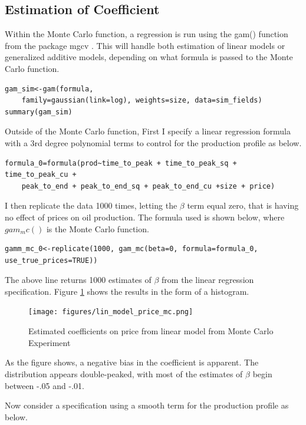 \documentclass[11pt]{article}
\begin{document}
\begin{spacing}{1}
\subsection{Estimation of Coefficient}

Within the Monte Carlo function, a regression is run using the gam() function from the package mgcv \citet{wood_generalized_2006}.  This will handle both estimation of linear models or generalized additive models, depending on what formula is passed to the Monte Carlo function.  

\begin{verbatim}
gam_sim<-gam(formula,
	family=gaussian(link=log), weights=size, data=sim_fields)
summary(gam_sim)
\end{verbatim}

Outside of the Monte Carlo function, First I specify a linear regression formula with a 3rd degree polynomial terms to control for the production profile as below.  

\begin{verbatim}
formula_0=formula(prod~time_to_peak + time_to_peak_sq + time_to_peak_cu + 
	peak_to_end + peak_to_end_sq + peak_to_end_cu +size + price)
\end{verbatim}

I then replicate the data 1000 times, letting the $\beta$ term equal zero, that is having no effect of prices on oil production.  The formula used is shown below, where $gam_mc()$ is the Monte Carlo function.  

\begin{verbatim}
gamm_mc_0<-replicate(1000, gam_mc(beta=0, formula=formula_0, use_true_prices=TRUE))
\end{verbatim}

The above line returns 1000 estimates of $\beta$ from the linear regression specification.  Figure \ref{lin_model_price_mc} shows the results in the form of a histogram.

\begin{figure}
	\texttt{[image: figures/lin\_model\_price\_mc.png]}
	\caption{Estimated coefficients on price from linear model from Monte Carlo Experiment}
	\label{lin_model_price_mc}	
\end{figure}

As the figure shows, a negative bias in the coefficient is apparent.  The distribution appears double-peaked, with most of the estimates of $\beta$ begin between -.05 and -.01.   

Now consider a specification using a smooth term for the production profile as below.


\end{spacing}
\end{document}
